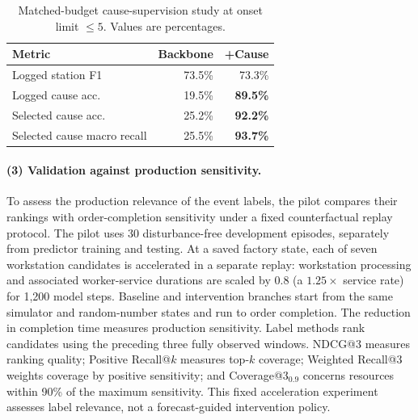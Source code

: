 \begin{table}[!htbp]
\centering
\caption{Matched-budget cause-supervision study at onset limit $\leq5$. Values are percentages.}
\label{tab:matched-cause}
\footnotesize
\setlength{\tabcolsep}{3.5pt}
\renewcommand{\arraystretch}{1.08}
\begin{fittable}
\begin{tabular*}{\linewidth}{@{\extracolsep{\fill}}lrr@{}}
\toprule
Metric & Backbone & +Cause \\
\midrule
Logged station F1 & 73.5\% & 73.3\% \\
Logged cause acc. & 19.5\% & \textbf{89.5\%} \\
Selected cause acc. & 25.2\% & \textbf{92.2\%} \\
Selected cause macro recall & 25.5\% & \textbf{93.7\%} \\
\bottomrule
\end{tabular*}
\end{fittable}
\end{table}

\paragraph*{(3) Validation against production sensitivity.}
To assess the production relevance of the event labels, the pilot compares their rankings with order-completion sensitivity under a fixed counterfactual replay protocol. The pilot uses 30 disturbance-free development episodes, separately from predictor training and testing. At a saved factory state, each of seven workstation candidates is accelerated in a separate replay: workstation processing and associated worker-service durations are scaled by $0.8$ (a $1.25\times$ service rate) for 1,200 model steps. Baseline and intervention branches start from the same simulator and random-number states and run to order completion. The reduction in completion time measures production sensitivity. Label methods rank candidates using the preceding three fully observed windows. NDCG@3 measures ranking quality; Positive Recall@$k$ measures top-$k$ coverage; Weighted Recall@3 weights coverage by positive sensitivity; and Coverage@3$_{0.9}$ concerns resources within 90\% of the maximum sensitivity. This fixed acceleration experiment assesses label relevance, not a forecast-guided intervention policy.

